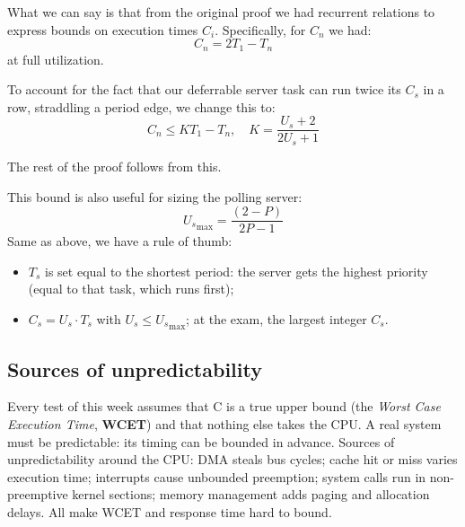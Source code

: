 \documentclass[a4paper,11pt]{article}
\begin{document}
What we can say is that from the original proof we had recurrent relations to express bounds on execution times $C_i$. Specifically, for $C_n$ we had:
$$
	C_n = 2 T_1 - T_n
$$
at full utilization.

To account for the fact that our deferrable server task can run twice its $C_s$ in a row, straddling a period edge, we change this to:
$$
	C_n \leq K T_1 - T_n, \quad K = \frac{U_s + 2}{2 U_s + 1}
$$

The rest of the proof follows from this.

\par\smallskip

This bound is also useful for sizing the polling server:
$$
	{U_s}_\text{max} = \frac{(2 - P)}{2P - 1}
$$
Same as above, we have a rule of thumb:
\begin{itemize}
	\item $T_s$ is set equal to the shortest period: the server gets the highest priority (equal to that task, which runs first);
	\item $C_s = U_s \cdot T_s$ with $U_s \leq {U_s}_\text{max}$; at the exam, the largest integer $C_s$.
\end{itemize}

\subsection{Sources of unpredictability}

Every test of this week assumes that C is a true upper bound (the \textit{Worst Case Execution Time}, \textbf{WCET}) and that nothing else takes the CPU. A real system must be predictable: its timing can be bounded in advance.
Sources of unpredictability around the CPU: DMA steals bus cycles; cache hit or miss varies execution time; interrupts cause unbounded preemption; system calls run in non-preemptive kernel sections; memory management adds paging and allocation delays. All make WCET and response time hard to bound.
\end{document}

